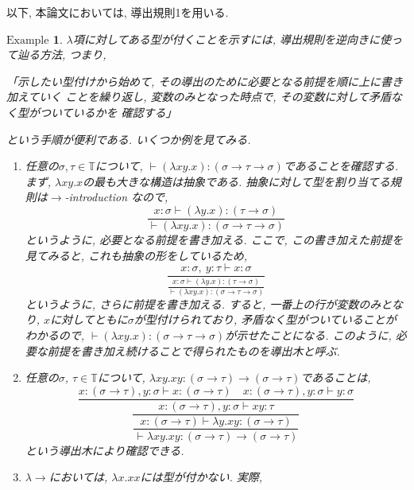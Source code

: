 \documentclass[11pt]{jsreport}
\theoremstyle{mystyle}
\newtheorem{ex}[df]{$\textrm{Example}$}
\newcommand{\T}{\mathbb{T}}
\newcommand{\lama}{\lambda \! \! \to}
\newcommand{\0}{\textbf{0}}
\begin{document}
以下, 本論文においては, 導出規則1を用いる.
\begin{ex}%
$\lambda$項に対してある型が付くことを示すには, 
      導出規則を逆向きに使って辿る方法, つまり, 
      
        「示したい型付けから始めて, その導出のために必要となる前提を順に上に書き加えていく
        ことを繰り返し, 変数のみとなった時点で, その変数に対して矛盾なく型がついているかを
        確認する」
        
      という手順が便利である. いくつか例を見てみる. 
  \begin{enumerate}
    \item  任意の$\sigma, \tau \in \T$について, 
      $\vdash (\lambda x y . x) \colon (\sigma \to \tau \to \sigma)$であることを確認する. 
      まず, $\lambda x y . x$の最も大きな構造は抽象である. 
      抽象に対して型を割り当てる規則は$\to$-introduction なので, 
      \[
        \frac{x \colon \sigma \vdash (\lambda y . x) \colon (\tau \to \sigma)}
          {\vdash (\lambda x y . x) \colon (\sigma \to \tau \to \sigma)}
      \]
        というように, 必要となる前提を書き加える. ここで, この書き加えた前提を見てみると, 
        これも抽象の形をしているため, 
      \[
        \frac{x \colon \sigma,\ y \colon \tau \vdash x \colon \sigma}
       {\displaystyle{\frac{x \colon \sigma \vdash (\lambda y . x) \colon (\tau \to \sigma)}
          {\vdash (\lambda x y . x) \colon (\sigma \to \tau \to \sigma)}}}
      \]
      というように, さらに前提を書き加える. すると, 一番上の行が変数のみとなり, 
      $x$に対してともに$\sigma$が型付けられており, 矛盾なく型がついていることがわかるので, 
      $\vdash (\lambda x y . x) \colon (\sigma \to \tau \to \sigma)$が示せたことになる. 
      このように, 必要な前提を書き加え続けることで得られたものを導出木と呼ぶ. 
      \item 任意の$\sigma$, $\tau \in \T$について, 
        $\lambda xy . xy \colon (\sigma \to \tau) \to (\sigma \to \tau)$であることは, 
        \[
      \dfrac{x \colon (\sigma \to \tau), y \colon \sigma \vdash x \colon (\sigma \to \tau)
      \quad x \colon (\sigma \to \tau), y \colon \sigma \vdash y \colon \sigma}
          {\dfrac{x \colon (\sigma \to \tau), y \colon \sigma \vdash xy \colon \tau}
          {\dfrac{x \colon (\sigma \to \tau) \vdash \lambda y . xy \colon (\sigma \to \tau)}
          {\vdash \lambda xy . xy \colon (\sigma \to \tau) \to (\sigma \to \tau)}}}
        \]
        という導出木により確認できる. 
    \item $\lama$においては, $\lambda x . xx$には型が付かない. 実際, 

\end{enumerate}
\end{ex}
\end{document}
